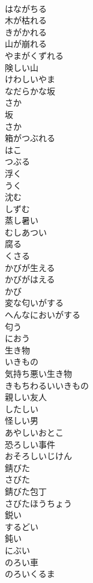 \documentclass[8pt]{extreport}
\begin{document}
\begin{CJK}{UTF8}{min}
\\	はながちる
\\	木が枯れる	
\\	きがかれる
\\	山が崩れる	
\\	やまがくずれる
\\	険しい山	
\\	けわしいやま
\\	なだらかな坂	
\\	さか
\\	坂	
\\	さか
\\	箱がつぶれる	
\\	はこ
\\	つぶる	
\\	浮く	
\\	うく
\\	沈む	
\\	しずむ
\\	蒸し暑い	
\\	むしあつい
\\	腐る	
\\	くさる
\\	かびが生える	
\\	かびがはえる
\\	かび	
\\	変な匂いがする	
\\	へんなにおいがする
\\	匂う	
\\	におう
\\	生き物	
\\	いきもの
\\	気持ち悪い生き物	
\\	きもちわるいいきもの
\\	親しい友人	
\\	したしい
\\	怪しい男	
\\	あやしいおとこ
\\	恐ろしい事件	
\\	おそろしいじけん
\\	錆びた	
\\	さびた
\\	錆びた包丁	
\\	さびたほうちょう
\\	鋭い	
\\	するどい
\\	鈍い	
\\	にぶい
\\	のろい車	
\\	のろいくるま

\end{CJK}
\end{document}
